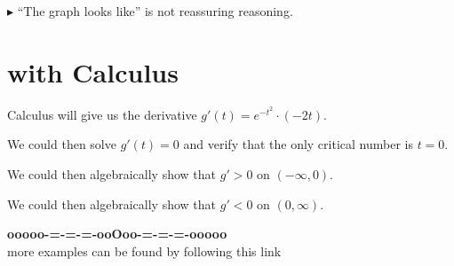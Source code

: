 \documentclass{ximera}
\begin{document}
\textbf{\textcolor{red!70!black}{$\blacktriangleright$}} ``The graph looks like'' is not reassuring reasoning. 







\section*{with Calculus}

Calculus will give us the derivative $g'(t) = e^{-t^2} \cdot (-2t)$.  


We could then solve $g'(t) = 0$ and verify that the only critical number is $t = 0$.

We could then algebraically show that $g' > 0$ on $(-\infty, 0)$.

We could then algebraically show that $g' < 0$ on $(0, \infty)$.








\begin{center}
\textbf{\textcolor{green!50!black}{ooooo-=-=-=-ooOoo-=-=-=-ooooo}} \\

more examples can be found by following this link\\ 

\end{center}
\end{document}
